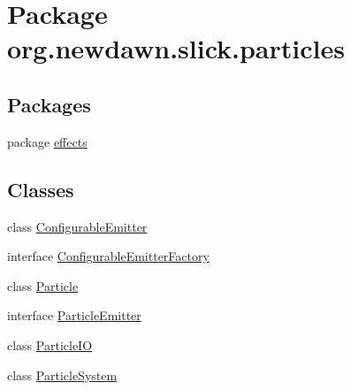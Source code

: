 \hypertarget{namespaceorg_1_1newdawn_1_1slick_1_1particles}{}\section{Package org.\+newdawn.\+slick.\+particles}
\label{namespaceorg_1_1newdawn_1_1slick_1_1particles}
\subsection*{Packages}
\begin{DoxyCompactItemize}
\item 
package \mbox{\hyperlink{namespaceorg_1_1newdawn_1_1slick_1_1particles_1_1effects}{effects}}
\end{DoxyCompactItemize}
\subsection*{Classes}
\begin{DoxyCompactItemize}
\item 
class \mbox{\hyperlink{classorg_1_1newdawn_1_1slick_1_1particles_1_1_configurable_emitter}{Configurable\+Emitter}}
\item 
interface \mbox{\hyperlink{interfaceorg_1_1newdawn_1_1slick_1_1particles_1_1_configurable_emitter_factory}{Configurable\+Emitter\+Factory}}
\item 
class \mbox{\hyperlink{classorg_1_1newdawn_1_1slick_1_1particles_1_1_particle}{Particle}}
\item 
interface \mbox{\hyperlink{interfaceorg_1_1newdawn_1_1slick_1_1particles_1_1_particle_emitter}{Particle\+Emitter}}
\item 
class \mbox{\hyperlink{classorg_1_1newdawn_1_1slick_1_1particles_1_1_particle_i_o}{Particle\+IO}}
\item 
class \mbox{\hyperlink{classorg_1_1newdawn_1_1slick_1_1particles_1_1_particle_system}{Particle\+System}}
\end{DoxyCompactItemize}
